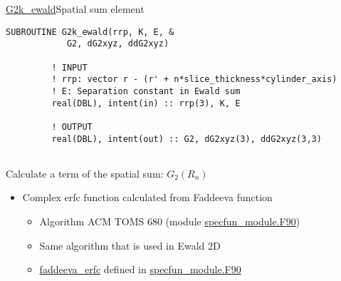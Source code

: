 
\begin{frame}{\url{G2k_ewald}}{Spatial sum element}
  
  \begin{lstlisting}[style=myFORTRANcodeS]
      SUBROUTINE G2k_ewald(rrp, K, E, &
            G2, dG2xyz, ddG2xyz)

         ! INPUT
         ! rrp: vector r - (r' + n*slice_thickness*cylinder_axis) 
         ! E: Separation constant in Ewald sum
         real(DBL), intent(in) :: rrp(3), K, E

         ! OUTPUT
         real(DBL), intent(out) :: G2, dG2xyz(3), ddG2xyz(3,3)
            
  \end{lstlisting}

  \vbs


  Calculate a term of the spatial sum: $G_2(R_n)$

  \begin{itemize}\small
    \item Complex erfc function calculated from Faddeeva function
      \begin{itemize}\footnotesize
        \item Algorithm ACM TOMS 680 (module \url{specfun_module.F90}) 
        \item Same algorithm that is used in Ewald 2D 
        \item \url{faddeeva_erfc} defined in \url{specfun_module.F90} 
      \end{itemize}
  \end{itemize}


\end{frame}


